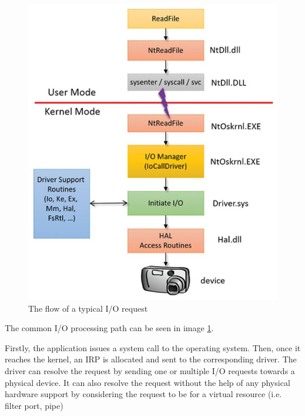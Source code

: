 	
		\begin{figure}[h!]
			\begin{center}
				\includegraphics[scale=0.9]{images/IORequest.jpg}
				\caption{The flow of a typical I/O request\cite{WindowsInternals}}
				\label{fig:IORequest}
			\end{center}
		\end{figure}
		\pagebreak

		The common I/O processing path can be seen in image \ref{fig:IORequest}.

		Firstly, the application issues a system call to the operating system. Then, once it reaches the kernel, an IRP is allocated and sent to the corresponding driver. The driver can resolve the request by sending one or multiple I/O requests towards a physical device. It can also resolve the request without the help of any physical hardware support by considering the request to be for a virtual resource (i.e. filter port, pipe)
		
		
